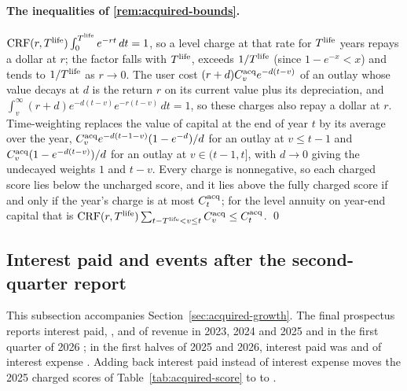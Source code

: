 \paragraph{The inequalities of \autoref{rem:acquired-bounds}.}
$\mathrm{CRF}(r,T^{\rm life})\int_0^{T^{\rm life}}e^{-rt}\,dt=1$, so a level charge at that rate for $T^{\rm life}$ years repays a dollar at $r$; the factor falls with $T^{\rm life}$, exceeds $1/T^{\rm life}$ (since $1-e^{-x}<x$) and tends to $1/T^{\rm life}$ as $r\to0$. The user cost $(r+d)C^{\rm acq}_ve^{-d(t-v)}$ of an outlay whose value decays at $d$ is the return $r$ on its current value plus its depreciation, and $\int_v^\infty(r+d)e^{-d(t-v)}e^{-r(t-v)}\,dt=1$, so these charges also repay a dollar at $r$. Time-weighting replaces the value of capital at the end of year $t$ by its average over the year, $C^{\rm acq}_ve^{-d(t-1-v)}(1-e^{-d})/d$ for an outlay at $v\le t-1$ and $C^{\rm acq}_v(1-e^{-d(t-v)})/d$ for an outlay at $v\in(t-1,t]$, with $d\to0$ giving the undecayed weights $1$ and $t-v$. Every charge is nonnegative, so each charged score lies below the uncharged score, and it lies above the fully charged score if and only if the year's charge is at most $C^{\rm acq}_t$; for the level annuity on year-end capital that is $\mathrm{CRF}(r,T^{\rm life})\sum_{t-T^{\rm life}<v\le t}C^{\rm acq}_v\le C^{\rm acq}_t$. \qed

\subsection{Interest paid and events after the second-quarter report}\label{app:acquired-after}
This subsection accompanies Section~\ref{sec:acquired-growth}. The final prospectus reports interest paid, \acqIntPaidShTwentyThree, \acqIntPaidShTwentyFour{} and \acqIntPaidShTwentyFive{} of revenue in 2023, 2024 and 2025 and \acqIntPaidShQOne{} in the first quarter of 2026 \citep{bendingspoons2026prospectus}; in the first halves of 2025 and 2026, interest paid was \acqIntPaidRatioHOneFive{} and \acqIntPaidRatioHOneSix{} of interest expense \citep{bendingspoons2026sixk}. Adding back interest paid instead of interest expense moves the 2025 charged scores of Table~\ref{tab:acquired-score} to \acqChPaidLo{} to \acqChPaidHi.

